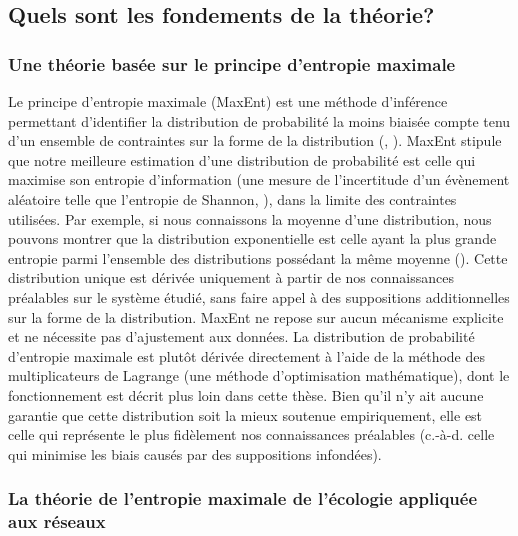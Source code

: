 \subsection{Quels sont les fondements de la théorie?} 

\subsubsection{Une théorie basée sur le principe d'entropie maximale} 

Le principe d'entropie maximale (MaxEnt) est une méthode d'inférence permettant
d'identifier la distribution de probabilité la moins biaisée compte tenu d'un
ensemble de contraintes sur la forme de la distribution
(\cite{Jaynes1957Informationa}, \cite{Jaynes1957Information}). MaxEnt stipule
que notre meilleure estimation d'une distribution de probabilité est celle qui
maximise son entropie d'information (une mesure de l'incertitude d'un évènement
aléatoire telle que l'entropie de Shannon, \cite{Shannon1948Mathematical}), dans
la limite des contraintes utilisées. Par exemple, si nous connaissons la moyenne
d'une distribution, nous pouvons montrer que la distribution exponentielle est
celle ayant la plus grande entropie parmi l'ensemble des distributions possédant
la même moyenne (\cite{Frank2011Simple}). Cette distribution unique est dérivée
uniquement à partir de nos connaissances préalables sur le système étudié, sans
faire appel à des suppositions additionnelles sur la forme de la distribution.
MaxEnt ne repose sur aucun mécanisme explicite et ne nécessite pas d'ajustement
aux données. La distribution de probabilité d'entropie maximale est plutôt
dérivée directement à l'aide de la méthode des multiplicateurs de Lagrange (une
méthode d'optimisation mathématique), dont le fonctionnement est décrit plus
loin dans cette thèse. Bien qu'il n'y ait aucune garantie que cette distribution
soit la mieux soutenue empiriquement, elle est celle qui représente le plus
fidèlement nos connaissances préalables (c.-à-d. celle qui minimise les biais
causés par des suppositions infondées). 

\subsubsection{La théorie de l'entropie maximale de l'écologie appliquée aux réseaux} 

